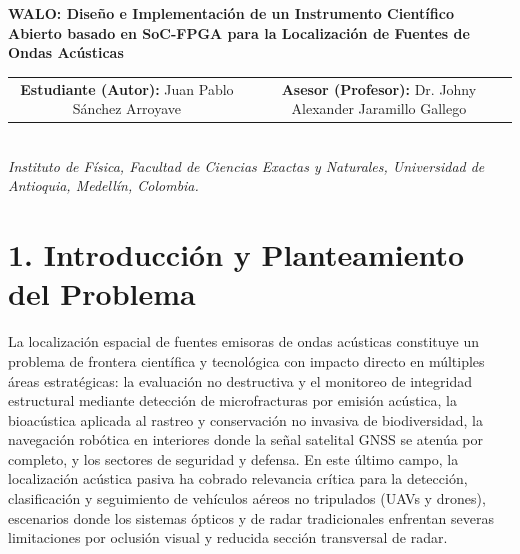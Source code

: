 \documentclass[10.5pt,letterpaper]{article}
\begin{document}
\pagestyle{empty}

\begin{center}
    {\large\bfseries\color{UdeAGreen} WALO: Diseño e Implementación de un Instrumento Científico Abierto basado en SoC-FPGA para la Localización de Fuentes de Ondas Acústicas}\\[0.35cm]
    
    \begin{tabular}{cc}
        \textbf{Estudiante (Autor):} Juan Pablo Sánchez Arroyave & \quad \textbf{Asesor (Profesor):} Dr. Johny Alexander Jaramillo Gallego
    \end{tabular}\\[0.12cm]
    
    {\small\textit{Instituto de Física, Facultad de Ciencias Exactas y Naturales, Universidad de Antioquia, Medellín, Colombia.}}
\end{center}

\vspace{0.05cm}

\section*{1. Introducción y Planteamiento del Problema}
La localización espacial de fuentes emisoras de ondas acústicas constituye un problema de frontera científica y tecnológica con impacto directo en múltiples áreas estratégicas: la evaluación no destructiva y el monitoreo de integridad estructural mediante detección de microfracturas por emisión acústica, la bioacústica aplicada al rastreo y conservación no invasiva de biodiversidad, la navegación robótica en interiores donde la señal satelital GNSS se atenúa por completo, y los sectores de seguridad y defensa. En este último campo, la localización acústica pasiva ha cobrado relevancia crítica para la detección, clasificación y seguimiento de vehículos aéreos no tripulados (UAVs y drones), escenarios donde los sistemas ópticos y de radar tradicionales enfrentan severas limitaciones por oclusión visual y reducida sección transversal de radar.
\end{document}
